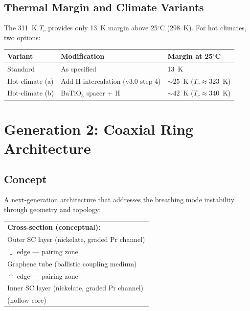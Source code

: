 \documentclass[11pt, a4paper]{article}
\begin{document}
\subsection{Thermal Margin and Climate Variants}

The 311~K $T_c$ provides only 13~K margin above 25$^\circ$C (298~K).
For hot climates, two options:

\begin{center}
\begin{tabular}{@{}lll@{}}
\toprule
\textbf{Variant} & \textbf{Modification} & \textbf{Margin at 25$^\circ$C} \\
\midrule
Standard & As specified & 13~K \\
Hot-climate (a) & Add H intercalation (v3.0 step 4) &
  $\sim 25$~K ($T_c \approx 323$~K) \\
Hot-climate (b) & BaTiO$_3$ spacer + H & $\sim 42$~K ($T_c \approx 340$~K) \\
\bottomrule
\end{tabular}
\end{center}

\section{Generation 2: Coaxial Ring Architecture}
\label{sec:gen2}

\subsection{Concept}

A next-generation architecture that addresses the breathing mode
instability through geometry and topology:

\begin{center}
\begin{tabular}{@{}p{12cm}@{}}
\midrule
\textbf{Cross-section (conceptual):} \\[6pt]
Outer SC layer (nickelate, graded Pr channel) \\
$\downarrow$ edge --- pairing zone \\
Graphene tube (ballistic coupling medium) \\
$\uparrow$ edge --- pairing zone \\
Inner SC layer (nickelate, graded Pr channel) \\
\quad\quad (hollow core) \\
\midrule
\end{tabular}
\end{center}
\end{document}
